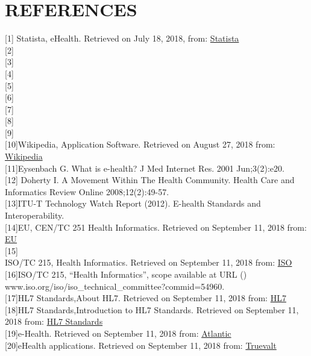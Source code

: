 \documentclass[a4paper]{article}
\begin{document}
\section{REFERENCES}
\vspace{-10pt}
[1] Statista, eHealth. Retrieved on July 18, 2018, from:
\href{https://www.statista.com/outlook/312/100/ehealth/worldwide#market-users}{Statista}\\
[2][2]\\
[3][3]\\
[4][4]\\
[5][5]\\
[6][6]\\
[7][7]\\
[8][8]\\
[9][9]\\
[10][10]Wikipedia, Application Software. Retrieved on August 27, 2018 from: \href{https://en.wikipedia.org/wiki/Application_software}{Wikipedia}\\
[11][11]Eysenbach G. What is e-health? J Med Internet Res. 2001 Jun;3(2):e20.\\
[12][12] Doherty I. A Movement Within The Health Community. Health Care and Informatics Review Online 2008;12(2):49-57.\\
[13][13]ITU-T Technology Watch Report (2012). E-health Standards and Interoperability.\\
[14][14]EU, CEN/TC 251 Health Informatics. Retrieved on September 11, 2018 from: \href{http://www.ehealth-standards.eu}{EU}\\
[15][15]\\ISO/TC 215, Health Informatics. Retrieved on September 11, 2018 from: \href{https://www.iso.org/committee/54960.html}{ISO}\\
[16][16]ISO/TC 215, “Health Informatics”, scope available at URL ()
www.iso.org/iso/iso_technical_committee?commid=54960. \\
[17][17]HL7 Standards,About HL7. Retrieved on September 11, 2018 from: \href{http://www.hl7.org/about/index.cfm?ref=nav}{HL7}\\
[18][18]HL7 Standards,Introduction to HL7 Standards. Retrieved on September 11, 2018 from: \href{http://www.hl7.org/implement/standards/index.cfm?ref=nav}{HL7 Standards}\\
[19][19]e-Health. Retrieved on September 11, 2018 from: \href{https://www.atlantic.net/hipaa-compliant-hosting/what-are-e-health-applications/}{Atlantic}\\
[20][20]eHealth applications. Retrieved on September 11, 2018 from: \href{https://www.truevault.com/ehealth.html}{Truevalt}\\
\end{document}
